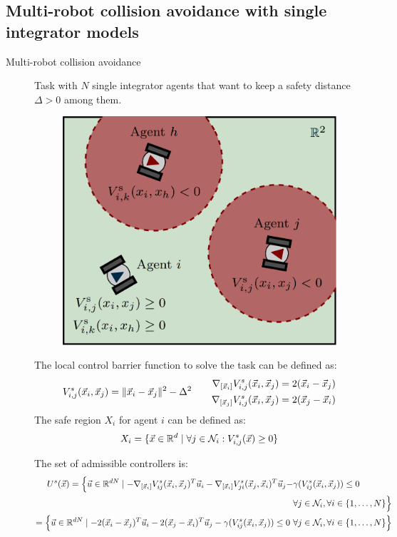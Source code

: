 \subsection{Multi-robot collision avoidance with single integrator models}


\begin{description}
    \item[Multi-robot collision avoidance] 
        Task with $N$ single integrator agents that want to keep a safety distance $\Delta > 0$ among them.

        \begin{figure}[H]
            \centering
            \includegraphics[width=0.35\linewidth]{./img/safety_control_multi.png}
        \end{figure}

        The local control barrier function to solve the task can be defined as:
        \[
            V^s_{i,j}({\vec{x}}_i, {\vec{x}}_j) = \Vert {\vec{x}}_i - {\vec{x}}_j \Vert^2 - \Delta^2
            \qquad
            \begin{aligned}
                \nabla_{[{\vec{x}}_i]} V_{i,j}^s({\vec{x}}_i, {\vec{x}}_j) &= 2({\vec{x}}_i - {\vec{x}}_j) \\
                \nabla_{[{\vec{x}}_j]} V_{i,j}^s({\vec{x}}_i, {\vec{x}}_j) &= 2({\vec{x}}_j - {\vec{x}}_i)
            \end{aligned}
        \]
        The safe region $X_i$ for agent $i$ can be defined as:
        \[
            X_i = \{ {\vec{x}} \in \mathbb{R}^d \mid \forall j \in \mathcal{N}_i: V_{i,j}^s({\vec{x}}) \geq 0 \}
        \]

        The set of admissible controllers is:
        \[
            \begin{aligned}
                \begin{aligned}
                    U^s({\vec{x}}) = \Big\{ {\vec{u}} \in \mathbb{R}^{dN} \mid 
                    -\nabla_{[{\vec{x}}_i]} V_{ij}^s({\vec{x}}_i, {\vec{x}}_j)^T {\vec{u}}_i 
                    - \nabla_{[{\vec{x}}_i]} V_{ji}^s({\vec{x}}_j, {\vec{x}}_i)^T {\vec{u}}_j 
                    - &\gamma(V_{ij}^{s}({\vec{x}}_i, {\vec{x}}_j)) \leq 0 \\
                    &\forall j \in \mathcal{N}_i, \forall i \in \{1, \dots, N\} \Big\}
                \end{aligned} \\
                = \Big\{ {\vec{u}} \in \mathbb{R}^{dN} \mid -2({\vec{x}}_i-{\vec{x}}_j)^T {\vec{u}}_i - 2({\vec{x}}_j-{\vec{x}}_i)^T {\vec{u}}_j - \gamma(V_{ij}^s({\vec{x}}_i, {\vec{x}}_j)) \leq 0 \,\,\forall j \in \mathcal{N}_i, \forall i \in \{1, \dots, N\} \Big\}
            \end{aligned}
        \]

\end{description}

